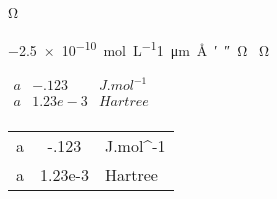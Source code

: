 \documentclass{scrbook}
\begin{document}
  \ifdefined\gtfamily\gtfamily\fi Ω
  {\ExplSyntaxOn\makeatletter
   \ttfamily\meaning\@begindocumenthook}
  
  \SI{-2.5e-10}{mol.L^{-1}}\SI{1}{\micro\metre\angstrom\arcminute\arcsecond\ohm}
  \vrule\SI{}{\ohm}\vrule

 $\begin{array}{lSs}
   a&-.123 & J.mol^{-1} \\
   a&1.23e-3 & Hartree \\
  \end{array}$

\begin{tabular}{lSs}
  a&-.123 & J.mol^{-1} \\
  a&1.23e-3 & Hartree \\
\end{tabular}
\end{document}
